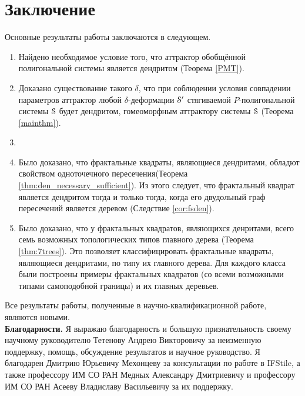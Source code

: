 \chapter*{Заключение}                       %


Основные результаты работы заключаются в следующем.

\begin{enumerate}
\item Найдено необходимое условие того, что аттрактор обобщённой полигональной системы является дендритом (Теорема \ref{PMT}). 

\item Доказано существование такого $\delta$, что при соблюдении условия совпадении параметров аттрактор любой $\delta$-деформации ${\EuScript S}'$ стягиваемой $P$-полигональной системы ${\EuScript S}$ будет дендритом, гомеоморфным аттрактору системы ${\EuScript S}$ (Теорема \ref{mainthm}).

\item 

\item Было доказано, что фрактальные квадраты, являющиеся дендритами, обладют свойством одноточечного пересечения(Теорема \ref{thm:den_necessary_sufficient}).
Из этого следует, что фрактальный квадрат является дендритом тогда и только тогда, когда его двудольный граф пересечений является деревом (Следствие \ref{cor:fsden}).

\item Было доказано, что у фрактальных квадратов, являющихся денритами, всего семь возможных топологических типов главного дерева (Теорема \ref{thm:7trees}).
Это позволяет классифицировать фрактальные квадраты, являющиеся дендритами, по типу их главного дерева.
Для каждого класса были построены примеры фрактальных квадратов (со всеми возможными типами самоподобной границы) и их главных деревьев.
\end{enumerate}

Все результаты работы, полученные в научно-квалификационной работе, являются новыми.\\

\textbf{Благодарности.}
Я выражаю благодарность и большую признательность своему научному руководителю
Тетенову Андрею Викторовичу за неизменную поддержку, помощь, обсуждение результатов и научное
руководство.
Я благодарен Дмитрию Юрьевичу Мехонцеву за консультации по работе в IFStile, а также профессору ИМ СО РАН Медных Александру Дмитриевичу и профессору ИМ СО РАН Асееву Владиславу Васильевичу за их поддержку.